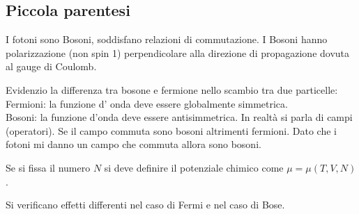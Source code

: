 \subsection{Piccola parentesi}
I fotoni sono Bosoni, soddisfano relazioni di commutazione. I Bosoni hanno polarizzazione (non spin 1) perpendicolare alla direzione di propagazione dovuta al gauge di Coulomb.

Evidenzio la differenza tra bosone e fermione nello scambio tra due particelle:\\
Fermioni: la funzione d' onda deve essere globalmente simmetrica.\\
Bosoni: la funzione d'onda deve essere antisimmetrica. In realtà si parla di campi (operatori). Se il campo commuta sono bosoni altrimenti fermioni. Dato che i fotoni mi danno un campo che commuta allora sono bosoni.

Se si fissa il numero $N$ si deve definire il potenziale chimico come $\mu=\mu\left(T,V,N\right)$.

Si verificano effetti differenti nel caso di Fermi e nel caso di Bose.

